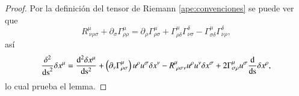 \begin{proof}
Por la definición del tensor de Riemann \ref{ape:convenciones} se puede ver que
\begin{equation}
\label{eq:16}
R^{\mu}_{\ \nu \rho \sigma} + \partial_{\sigma} \Gamma^{\mu}_{\rho \rho} = \partial_{\rho} \Gamma^{\mu}_{\rho \sigma} + \Gamma^{\mu}_{\rho \delta} \Gamma^{\delta}_{\nu \sigma} - \Gamma^{\mu}_{\sigma \delta} \Gamma^{\delta}_{\nu \rho},
\end{equation}
así
\begin{equation}
\frac{\delta^2}{\mathrm{ds}^2}\delta x^{\mu} = \dv[2]{\delta x^{\mu}}{ \mathrm{s} } + \left( \partial_{\nu} \Gamma^{\mu}_{\rho \sigma} \right) u^{\rho} u^{\sigma} \delta x^{\nu} - R^{\mu}_{\ \rho \sigma \nu} u^{\rho} u^{\nu} \delta x^{\sigma} + 2 \Gamma^{\mu}_{\sigma \rho} u^{\sigma} \dv{ }{ \mathrm{s} } \delta x^{\rho},
\end{equation}
lo cual prueba el lemma.
\end{proof}

